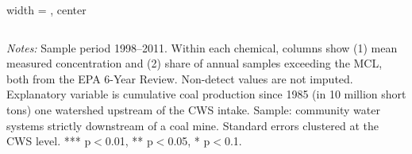 \begin{table}[htbp]
\begin{adjustbox}{width = \textwidth, center}
\begin{tabular}{lcc}
         \bottomrule
         
      \end{tabular}
      
      
      
   \end{adjustbox}
      {\tiny\linespread{1}\selectfont \par \raggedright 
   \textit{Notes:} Sample period 1998--2011. Within each chemical, columns show (1) mean measured concentration and (2) share of annual samples exceeding the MCL, both from the EPA 6-Year Review. Non-detect values are not imputed. Explanatory variable is cumulative coal production since 1985 (in 10 million short tons) one watershed upstream of the CWS intake. Sample: community water systems strictly downstream of a coal mine. Standard errors clustered at the CWS level. *** p$<$0.01, ** p$<$0.05, * p$<$0.1.}
   
\end{table}


